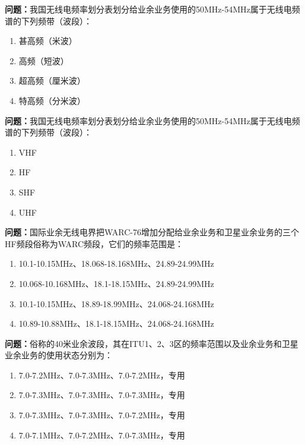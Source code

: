 \bigskip


\noindent\textbf{问题：}我国无线电频率划分表划分给业余业务使用的50MHz-54MHz属于无线电频谱的下列频带（波段）：
\begin{enumerate}[label=\Alph*), leftmargin=3em]
\item 甚高频（米波）
\item 高频（短波）
\item 超高频（厘米波）
\item 特高频（分米波）
\end{enumerate}

\bigskip


\noindent\textbf{问题：}我国无线电频率划分表划分给业余业务使用的50MHz-54MHz属于无线电频谱的下列频带（波段）：
\begin{enumerate}[label=\Alph*), leftmargin=3em]
\item VHF
\item HF
\item SHF
\item UHF
\end{enumerate}

\bigskip


\noindent\textbf{问题：}国际业余无线电界把WARC-76增加分配给业余业务和卫星业余业务的三个HF频段俗称为WARC频段，它们的频率范围是：
\begin{enumerate}[label=\Alph*), leftmargin=3em]
\item 10.1-10.15MHz、18.068-18.168MHz、24.89-24.99MHz
\item 10.068-10.168MHz、18.1-18.15MHz、24.89-24.99MHz
\item 10.1-10.15MHz、18.89-18.99MHz、24.068-24.168MHz
\item 10.89-10.88MHz、18.1-18.15MHz、24.068-24.168MHz
\end{enumerate}

\bigskip


\noindent\textbf{问题：}俗称的40米业余波段，其在ITU1、2、3区的频率范围以及业余业务和卫星业余业务的使用状态分别为：
\begin{enumerate}[label=\Alph*), leftmargin=3em]
\item 7.0-7.2MHz、7.0-7.3MHz、7.0-7.2MHz，专用
\item 7.0-7.3MHz、7.0-7.3MHz、7.0-7.3MHz，专用
\item 7.0-7.3MHz、7.0-7.3MHz、7.0-7.2MHz，专用
\item 7.0-7.1MHz、7.0-7.2MHz、7.0-7.3MHz，专用
\end{enumerate}

\bigskip


